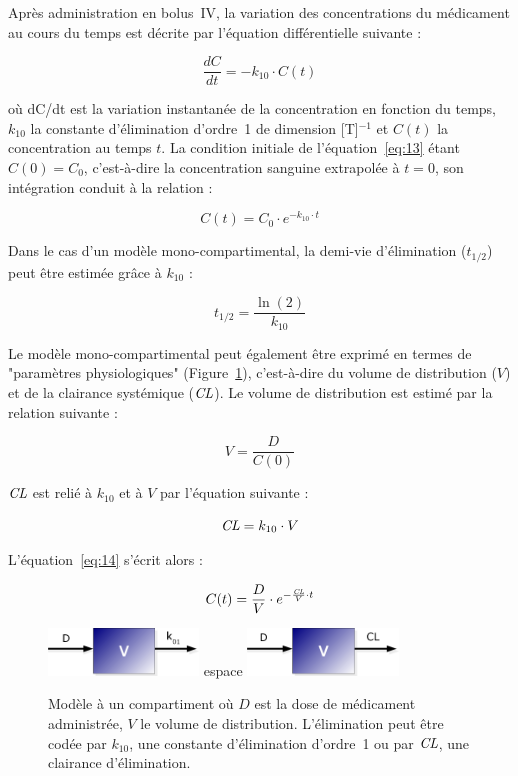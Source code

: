 Après administration en bolus~IV, la variation des concentrations du médicament au cours du temps est décrite par l'équation différentielle suivante :

\begin{equation}
\frac{dC}{dt} = -k_{10} \cdot C(t)
\label{eq:13}
\end{equation}

où dC/dt est la variation instantanée de la concentration en fonction du temps, $k_{10}$ la constante d'élimination d'ordre~1 de dimension [T]$^{-1}$ et $C(t)$ la concentration au temps $t$. La condition initiale de l'équation~\ref{eq:13} étant $C(0) = C_0$, c'est-à-dire la concentration sanguine extrapolée à $t = 0$, son intégration conduit à la relation :

\begin{equation}
C(t) = C_0 \cdot e^{-k_{10}\cdot t}
\label{eq:14}
\end{equation}

Dans le cas d'un modèle mono-compartimental, la demi-vie d'élimination ($t_{1/2}$) peut être estimée grâce à $k_{10}$ :

\begin{equation}
t_{1/2} = \frac{\ln(2)}{k_{10}}
\label{eq:15}
\end{equation}

Le modèle mono-compartimental peut également être exprimé en termes de "paramètres physiologiques" (Figure~\ref{fig:2}), c'est-à-dire du volume de distribution ($V$) et de la clairance systémique ($\operatorname{\textit{CL}}$). Le volume de distribution est estimé par la relation suivante :

\begin{equation}
V = \frac{D}{C(0)}
\label{eq:16}
\end{equation}

$\operatorname{\textit{CL}}$ est relié à $k_{10}$ et à $V$ par l'équation suivante :

\begin{equation}
\operatorname{\textit{CL}} = k_{10} \cdot V
\label{eq:17}
\end{equation}

L'équation~\ref{eq:14} s'écrit alors :

\begin{equation}
C(t) = \frac{D}{V} \cdot e^{-\frac{\operatorname{\textit{CL}}}{V}\cdot t}
\label{eq:18}
\end{equation}

\begin{figure}[htbp]
	\centering
		\includegraphics[width=4cm]{figures/raster/Figure2_1comp}
		espace \includegraphics[width=4cm]{figures/raster/Figure2_1comp_phy}
	\caption[Modèle à un compartiment]{Modèle à un compartiment où $D$ est la dose de médicament administrée, $V$ le volume de distribution. L'élimination peut être codée par $k_{10}$, une constante d'élimination d'ordre~1 ou par $\operatorname{\textit{CL}}$, une clairance d'élimination.}
	\label{fig:2}
\end{figure}

